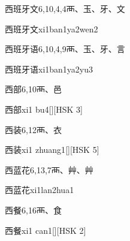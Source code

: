 \begin{entry}{西班牙文}{6,10,4,4}{⾑、⽟、⽛、⽂}
  \begin{phonetics}{西班牙文}{xi1ban1ya2wen2}
  \end{phonetics}
\end{entry}

\begin{entry}{西班牙语}{6,10,4,9}{⾑、⽟、⽛、⾔}
  \begin{phonetics}{西班牙语}{xi1ban1ya2yu3}
  \end{phonetics}
\end{entry}

\begin{entry}{西部}{6,10}{⾑、⾢}
  \begin{phonetics}{西部}{xi1 bu4}[][HSK 3]
  \end{phonetics}
\end{entry}

\begin{entry}{西装}{6,12}{⾑、⾐}
  \begin{phonetics}{西装}{xi1 zhuang1}[][HSK 5]
  \end{phonetics}
\end{entry}

\begin{entry}{西蓝花}{6,13,7}{⾑、⾋、⾋}
  \begin{phonetics}{西蓝花}{xi1lan2hua1}
  \end{phonetics}
\end{entry}

\begin{entry}{西餐}{6,16}{⾑、⾷}
  \begin{phonetics}{西餐}{xi1 can1}[][HSK 2]
  \end{phonetics}
\end{entry}

